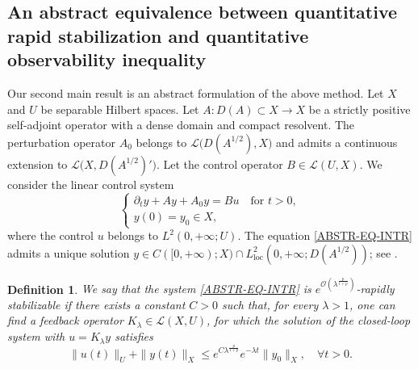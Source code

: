 \documentclass[a4paper]{article}
\newtheorem{definition}[theorem]{Definition}
\numberwithin{equation}{section}
\begin{document}
\subsection{An abstract equivalence between quantitative rapid stabilization and quantitative observability inequality}\label{ABS-SUBSET}
Our second main result is an {abstract} formulation of the above method. Let $X$ and $U$ be separable Hilbert spaces. Let $A:D(A)\subset X\to X$ be a strictly positive self-adjoint operator with a dense domain and compact resolvent. The perturbation operator $A_0$ belongs to $\mathcal{L}\big(D(A^{1/2}),X\big)$ and admits a continuous extension to $\mathcal{L}\big(X,D(A^{1/2})'\big)$. Let the control operator $B\in\mathcal L(U,X)$. We consider the linear control system
\begin{equation}\label{ABSTR-EQ-INTR}
\begin{cases}
\partial_t y+Ay+A_0y=Bu \quad \text{for } t>0,\\y(0)=y_0\in X,
\end{cases}
\end{equation}
where the control $u$ belongs to $L^2(0,+\infty;U)$. The equation \eqref{ABSTR-EQ-INTR} admits a unique solution $y\in C([0,+\infty);X)\cap L^2_{\text{loc}}(0,+\infty;D(A^{1/2}))$; see \cite{LM}.

\begin{definition}
 We say that the system \eqref{ABSTR-EQ-INTR} is {$e^{\mathcal O(\lambda^{\frac{p}{1+p}})}$-rapidly stabilizable} if there exists a constant $C>0$ such that, for every $\lambda>1$, one can find a feedback operator $K_\lambda\in \mathcal L(X,U)$, for which the solution of the closed-loop system with $u=K_\lambda y$ satisfies
\begin{equation}\label{q-rs-abstr}
\|u(t)\|_U+	\|y(t)\|_X\le e^{C\lambda^{\frac{p}{1+p}}}e^{-\lambda t}\|y_0\|_X,\quad \forall t>0.
\end{equation}
\end{definition}
\end{document}
